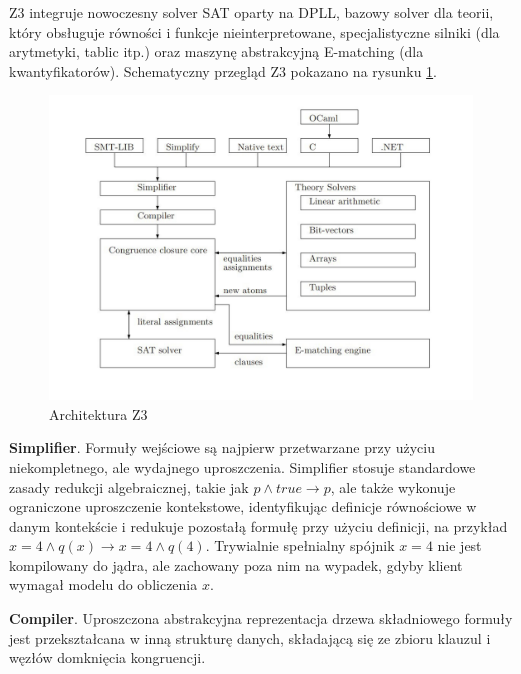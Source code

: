 Z3 integruje nowoczesny solver SAT oparty na DPLL, bazowy solver dla teorii, który obsługuje równości i funkcje nieinterpretowane, specjalistyczne silniki (dla arytmetyki, tablic itp.) oraz maszynę abstrakcyjną E-matching (dla kwantyfikatorów). Schematyczny przegląd Z3 pokazano na rysunku \ref{fig:z3}.		

\begin{figure}[htbp]
	\centering
	\begin{minipage}{\textwidth}
		\includegraphics[width=\textwidth]{./figures/z3_architecture}
		\caption{Architektura Z3}
		\label{fig:z3}
	\end{minipage}
\end{figure}

\textbf{Simplifier}. Formuły wejściowe są najpierw przetwarzane przy użyciu niekompletnego, ale wydajnego uproszczenia. Simplifier stosuje standardowe zasady redukcji algebraicznej, takie jak $p \land true \to p$, ale także wykonuje ograniczone uproszczenie kontekstowe, identyfikując definicje równościowe w danym kontekście i redukuje pozostałą formułę przy użyciu definicji, na przykład $x = 4 \land q(x) \to x = 4 \land q(4)$. Trywialnie spełnialny spójnik $x = 4$ nie jest kompilowany do jądra, ale zachowany poza nim na wypadek, gdyby klient wymagał modelu do obliczenia $x$.

\textbf{Compiler}. Uproszczona abstrakcyjna reprezentacja drzewa składniowego formuły jest przekształcana w inną strukturę danych, składającą się ze zbioru klauzul i węzłów domknięcia kongruencji.

